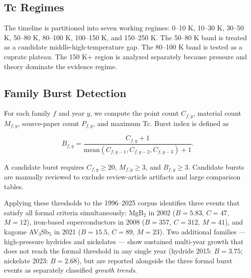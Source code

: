 \documentclass[11pt]{article}
\begin{document}
\subsection{Tc Regimes}

The timeline is partitioned into seven working regimes: 0--10 K, 10--30 K, 30--50 K, 50--80 K, 80--100 K, 100--150 K, and 150--250 K. The 50--80 K band is treated as a candidate middle-high-temperature gap. The 80--100 K band is tested as a cuprate plateau. The 150 K+ region is analyzed separately because pressure and theory dominate the evidence regime.

\subsection{Family Burst Detection}

For each family $f$ and year $y$, we compute the point count $C_{f,y}$, material count $M_{f,y}$, source-paper count $P_{f,y}$, and maximum Tc. Burst index is defined as

\begin{equation}
  B_{f,y} = \frac{C_{f,y} + 1}{\mathrm{mean}(C_{f,y-1}, C_{f,y-2}, C_{f,y-3}) + 1}.
  \label{eq:burst}
\end{equation}

A candidate burst requires $C_{f,y} \geq 20$, $M_{f,y} \geq 3$, and $B_{f,y} \geq 3$. Candidate bursts are manually reviewed to exclude review-article artifacts and large comparison tables.

Applying these thresholds to the 1996--2025 corpus identifies three events that satisfy all formal criteria simultaneously: MgB$_2$ in 2002 ($B = 5.83$, $C = 47$, $M = 12$), iron-based superconductors in 2008 ($B = 357$, $C = 312$, $M = 41$), and kagome AV$_3$Sb$_5$ in 2021 ($B = 15.5$, $C = 89$, $M = 23$). Two additional families --- high-pressure hydrides and nickelates --- show sustained multi-year growth that does not reach the formal threshold in any single year (hydride 2015: $B = 3.75$; nickelate 2023: $B = 2.68$), but are reported alongside the three formal burst events as separately classified \emph{growth trends}.
\end{document}
